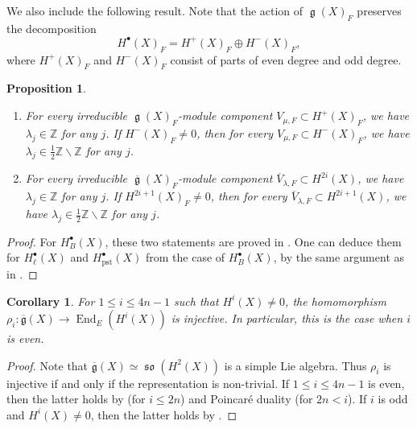 \documentclass[12pt,reqno]{amsart}
\newtheorem{cor}[thm]{Corollary}
\newtheorem{prop}[thm]{Proposition}
\theoremstyle{definition}
\newcommand{\Z}{{\mathds Z}}
\newcommand\End{\mathop{\mathrm{End}}\nolimits}
\renewcommand\ge{\mathop{\mathfrak{g}}\nolimits}
\newcommand\so{\mathop{\mathfrak{so}}\nolimits}
\newcommand{\frg}{\mathfrak{g}}
\DeclareMathOperator{\pst}{pst}
\numberwithin{equation}{section}
\begin{document}
We also include the following result.
Note that the action of $\ge(X)_F$ preserves
the decomposition
\[
H^\bullet(X)_F= H^{+}(X)_F \oplus H^-(X)_F,
\]
where $H^{+}(X)_F$ and $H^-(X)_F$ consist of parts of even degree and odd degree.

\begin{prop}\label{Proposition:reduced LLV irreducible component in general}
    \begin{enumerate}
        \item For every irreducible $\ge(X)_F$-module
    component
    $V_{\mu, F} \subset H^{+}(X)_F$, we have $\lambda_j \in \Z$ for any $j$. If $H^{-}(X)_F \neq 0$, then
    for every $V_{\mu, F} \subset H^{-}(X)_F$, we have $\lambda_j \in \frac{1}{2}\Z \backslash \Z$ for any $j$.
        \item For every irreducible $\overline{\ge}(X)_F$-module
    component
    $\overline{V}_{\lambda, F} \subset H^{2i}(X)$,
    we have $\lambda_j \in \Z$ for any $j$.
    If $H^{2i+1}(X)_F \neq0$, then for every
    $\overline{V}_{\lambda, F} \subset H^{2i+1}(X)$,
    we have $\lambda_j \in \frac{1}{2}\Z \backslash \Z$ for any $j$.
    \end{enumerate}
\end{prop}


\begin{proof}
    For $H^\bullet_B(X)$, these two statements are proved in \cite[Proposition 2.35]{GKLR}.
One can deduce them for $H^\bullet_\ell(X)$ and $H^\bullet_{\pst}(X)$ from the case of $H^\bullet_B(X)$, by the same argument as in .
\end{proof}



\begin{cor}\label{cor:InjectiveLLV}
For $1 \leq  i \leq 4n-1$
    such that $H^i(X) \neq 0$,
    the homomorphism
    $\rho_{i} \colon \overline{\frg}(X) \to \End_E(H^{i}(X))$
    is injective.
In particular, this is the case when $i$ is even.
\end{cor}

\begin{proof}
    Note that $\overline{\frg}(X) \simeq \so(H^2(X))$ is a simple Lie algebra.
    Thus $\rho_{i}$ is injective if and only if the representation is non-trivial.
    If $1 \leq  i \leq 4n-1$ is even, then the latter holds
    by
    (for $i \leq 2n$)
    and Poincar\'e duality (for $2n <i$).
    If $i$ is odd and $H^i(X) \neq 0$, then the latter holds by .
\end{proof}
\end{document}
